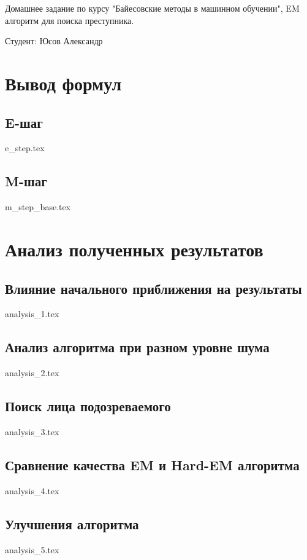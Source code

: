 \documentclass[unicode]{article}
\begin{document}
	Домашнее задание по курсу "Байесовские методы в машинном обучении", EM алгоритм для поиска преступника. 
	
	Студент: Юсов Александр
	\section{Вывод формул}
	
		\subsection{E-шаг}
		{e_step.tex}
		
		\subsection{M-шаг}
		{m_step_base.tex}
		
	\section{Анализ полученных результатов}
		
		\subsection{Влияние начального приближения на результаты}
		{analysis_1.tex}
		
		\subsection{Анализ алгоритма при разном уровне шума}
		{analysis_2.tex}
		
		\subsection{Поиск лица подозреваемого}
		{analysis_3.tex}
		
		\subsection{Сравнение качества EM и Hard-EM алгоритма}
		{analysis_4.tex}
		
		\subsection{Улучшения алгоритма}
		{analysis_5.tex}
\end{document}
